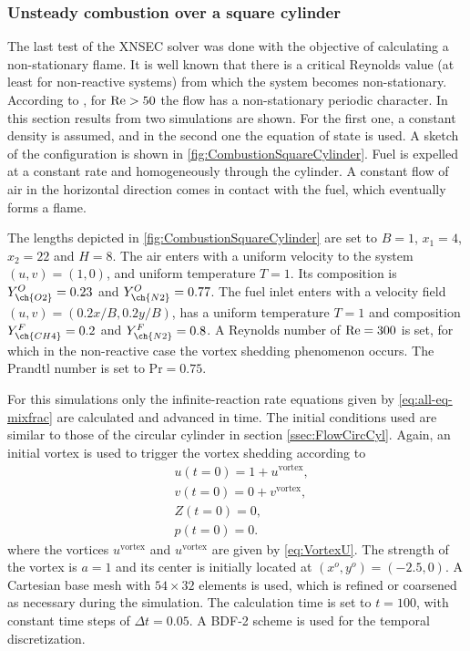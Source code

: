 \subsubsection{Unsteady combustion over a square cylinder}
The last test of the XNSEC solver was done with the objective of calculating a non-stationary flame. It is well known that there is a critical Reynolds value (at least for non-reactive systems) from which the system becomes non-stationary. According to \textcite{sharmaHeatFluidFlow2004}, for $\text{Re} > 50$ the flow has a non-stationary periodic character. In this section results from two simulations are shown. For the first one, a constant density is assumed, and in the second one the equation of state is used. 
A sketch of the configuration is shown in \cref{fig:CombustionSquareCylinder}. Fuel is expelled at a constant rate and homogeneously through the cylinder. A constant flow of air in the horizontal direction comes in contact with the fuel, which eventually forms a flame.

The lengths depicted in \cref{fig:CombustionSquareCylinder} are set to $B = 1$, $x_1 = 4$, $x_2 = 22$ and $H = 8$. The air enters with a uniform velocity to the system $(u,v) =(1,0)$, and uniform temperature $T = 1$. Its composition is $Y^O_{\ch{O2}} = 0.23$ and $Y^O_{\ch{N2}} = 0.77$. The fuel inlet enters with a velocity field $(u,v) = (0.2x/B,0.2y/B)$, has a uniform temperature $T = 1$ and composition $Y^F_{\ch{CH4}} = 0.2$ and $Y^F_{\ch{N2}} = 0.8$. A Reynolds number of $\text{Re} = 300$ is set, for which in the non-reactive case the vortex shedding phenomenon occurs. The Prandtl number is set to $\text{Pr} = 0.75$. 

For this simulations only the infinite-reaction rate equations given by \cref{eq:all-eq-mixfrac} are calculated and advanced in time. The initial conditions used are similar to those of the circular cylinder in section \cref{ssec:FlowCircCyl}. Again, an initial vortex is used to trigger the vortex shedding according to
\begin{subequations} 
	\begin{align}
		&u(t=0) = 1 + u^{\text{vortex}},  \\
		&v(t=0) = 0 + v^{\text{vortex}},  \\
		&Z(t=0) = 0,\\
		&p(t=0) = 0.
	\end{align}
\end{subequations}
where the vortices $u^{\text{vortex}}$ and $u^{\text{vortex}}$ are given by \cref{eq:VortexU}. The strength of the vortex is $a=1$ and its center is initially located at $(x^o,y^o) = (-2.5, 0)$. A Cartesian base mesh with $54\times32$ elements is used, which is refined or coarsened as necessary during the simulation. The calculation time is set to $t = 100$, with constant time steps of $\Delta t = 0.05$.  A BDF-2 scheme is used for the temporal discretization.

